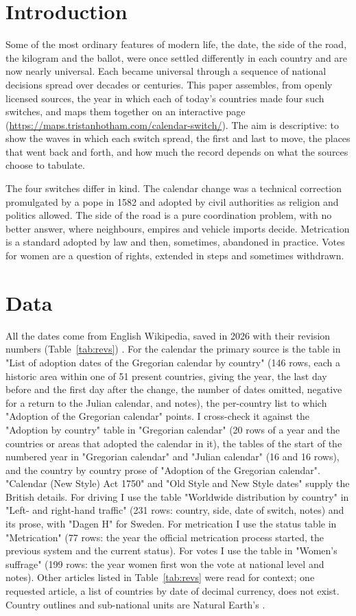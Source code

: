 \documentclass[11pt,a4paper]{article}
\begin{document}
\section{Introduction}
Some of the most ordinary features of modern life, the date, the side of the road, the kilogram and the ballot, were once settled differently in each country and are now nearly universal. Each became universal through a sequence of national decisions spread over decades or centuries. This paper assembles, from openly licensed sources, the year in which each of today's countries made four such switches, and maps them together on an interactive page (\url{https://maps.tristanhotham.com/calendar-switch/}). The aim is descriptive: to show the waves in which each switch spread, the first and last to move, the places that went back and forth, and how much the record depends on what the sources choose to tabulate.

The four switches differ in kind. The calendar change was a technical correction promulgated by a pope in 1582 and adopted by civil authorities as religion and politics allowed. The side of the road is a pure coordination problem, with no better answer, where neighbours, empires and vehicle imports decide. Metrication is a standard adopted by law and then, sometimes, abandoned in practice. Votes for women are a question of rights, extended in steps and sometimes withdrawn.

\section{Data}
All the dates come from English Wikipedia, saved in 2026 with their revision numbers (Table~\ref{tab:revs}) \citep{wiki}. For the calendar the primary source is the table in "List of adoption dates of the Gregorian calendar by country" (146 rows, each a historic area within one of 51 present countries, giving the year, the last day before and the first day after the change, the number of dates omitted, negative for a return to the Julian calendar, and notes), the per-country list to which "Adoption of the Gregorian calendar" points. I cross-check it against the "Adoption by country" table in "Gregorian calendar" (20 rows of a year and the countries or areas that adopted the calendar in it), the tables of the start of the numbered year in "Gregorian calendar" and "Julian calendar" (16 and 16 rows), and the country by country prose of "Adoption of the Gregorian calendar". "Calendar (New Style) Act 1750" and "Old Style and New Style dates" supply the British details. For driving I use the table "Worldwide distribution by country" in "Left- and right-hand traffic" (231 rows: country, side, date of switch, notes) and its prose, with "Dagen H" for Sweden. For metrication I use the status table in "Metrication" (77 rows: the year the official metrication process started, the previous system and the current status). For votes I use the table in "Women's suffrage" (199 rows: the year women first won the vote at national level and notes). Other articles listed in Table~\ref{tab:revs} were read for context; one requested article, a list of countries by date of decimal currency, does not exist. Country outlines and sub-national units are Natural Earth's \citep{naturalearth}.
\end{document}
